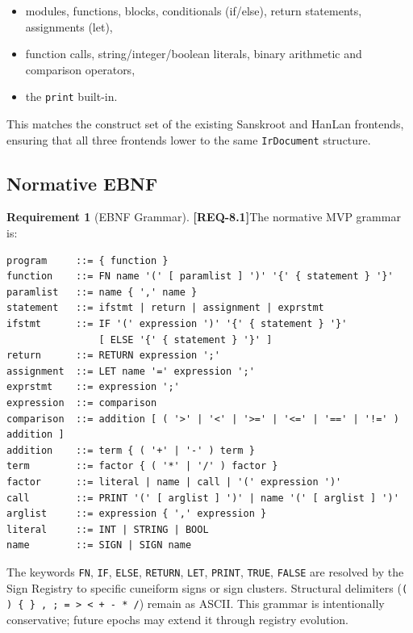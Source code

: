 \documentclass[11pt,a4paper,twoside]{article}
\theoremstyle{definition}
\newtheorem{requirement}{Requirement}[section]
\theoremstyle{remark}
\newcommand{\req}[1]{\textbf{\textcolor{reqred}{[REQ-#1]}}}
\begin{document}
\begin{itemize}[nosep]
  \item modules, functions, blocks, conditionals (if/else), return statements, assignments (let),
  \item function calls, string/integer/boolean literals, binary arithmetic and comparison operators,
  \item the \texttt{print} built-in.
\end{itemize}

This matches the construct set of the existing Sanskroot and HanLan frontends, ensuring that all three frontends lower to the same \texttt{IrDocument} structure.

\subsection{Normative EBNF}
\label{sec:ebnf}

\begin{requirement}[EBNF Grammar]
\label{req:ebnf}
\req{8.1}\quad The normative MVP grammar is:
\end{requirement}

\begin{lstlisting}[language=EBNF,caption={COL EBNF Grammar v3.0}]
program     ::= { function }
function    ::= FN name '(' [ paramlist ] ')' '{' { statement } '}'
paramlist   ::= name { ',' name }
statement   ::= ifstmt | return | assignment | exprstmt
ifstmt      ::= IF '(' expression ')' '{' { statement } '}'
                [ ELSE '{' { statement } '}' ]
return      ::= RETURN expression ';'
assignment  ::= LET name '=' expression ';'
exprstmt    ::= expression ';'
expression  ::= comparison
comparison  ::= addition [ ( '>' | '<' | '>=' | '<=' | '==' | '!=' ) addition ]
addition    ::= term { ( '+' | '-' ) term }
term        ::= factor { ( '*' | '/' ) factor }
factor      ::= literal | name | call | '(' expression ')'
call        ::= PRINT '(' [ arglist ] ')' | name '(' [ arglist ] ')'
arglist     ::= expression { ',' expression }
literal     ::= INT | STRING | BOOL
name        ::= SIGN | SIGN name
\end{lstlisting}

The keywords \texttt{FN}, \texttt{IF}, \texttt{ELSE}, \texttt{RETURN}, \texttt{LET}, \texttt{PRINT}, \texttt{TRUE}, \texttt{FALSE} are resolved by the Sign Registry to specific cuneiform signs or sign clusters. Structural delimiters (\texttt{( ) \{ \} , ; = > < + - * /}) remain as ASCII. This grammar is intentionally conservative; future epochs may extend it through registry evolution.
\end{document}
